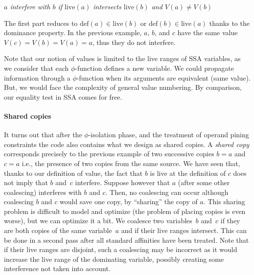 \centerline{\emph{$a$ interfere with $b$ if $\textrm{live}(a)$ intersects
  $\textrm{live}(b)$ and $V(a)\neq V(b)$}}

The first part reduces to $\textrm{def}(a)\in \textrm{live}(b)$ or $\textrm{def}(b)\in \textrm{live}(a)$ thanks to the dominance property. 
In the previous example, $a$, $b$, and $c$ have the same value $V(c)=V(b)=V(a)=a$, thus they do not interfere.

Note that our notion of values is limited to the live ranges of SSA variables, as we consider that each $\phi$-function defines a new variable. 
We could propagate information through a $\phi$-function when its arguments are equivalent (same value). 
But, we would face the complexity of general value numbering. 
By comparison, our equality test in SSA comes for free.

\paragraph{Shared copies}
It turns out that after the $\phi$-isolation phase, and the treatment of operand pining constraints the code also contains what we design as shared copies. 
A \emph{shared copy} corresponds precisely to the previous example of two successive copies $b=a$ and $c=a$ i.e., the presence of two copies from the same source. 
We have seen that, thanks to our definition of value, the fact that $b$ is live at the definition of $c$ does not imply that $b$ and~$c$ interfere. 
Suppose however that $a$ (after some other coalescing) interferes with $b$ and $c$. 
Then, no coalescing can occur although coalescing $b$ and $c$ would save one copy, by ``sharing'' the copy of $a$. 
This sharing problem is difficult to model and optimize (the problem of placing copies is even worse), but we can optimize it a bit. 
We coalesce two variables~$b$ and~$c$ if they are both copies of the same variable~$a$ and if their live ranges intersect. 
This can be done in a second pass after all standard affinities have been treated. 
Note that if their live ranges are disjoint, such a coalescing may be incorrect as it would increase the live range of the dominating variable, possibly creating some interference not taken into account.


